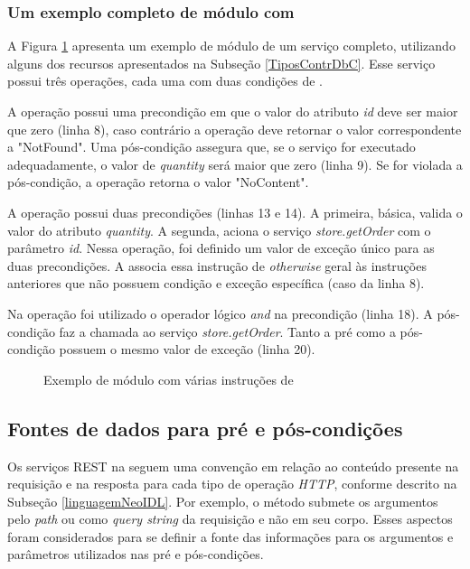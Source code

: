 \subsubsection{Um exemplo completo de módulo com \designbycontract{}}

A Figura \ref{lst:ModuloNeoVariosDbC} apresenta um exemplo de módulo \neoidl{}
de um serviço completo, utilizando alguns dos recursos apresentados na Subseção
\ref{TiposContrDbC}. Esse serviço possui três operações, cada uma com duas
condições de \designbycontract{}.

A operação  possui uma precondição em que o valor do atributo \emph{id} deve ser maior que zero (linha 8), caso contrário a operação deve retornar o valor
correspondente a "NotFound". Uma pós-condição assegura que, se o serviço for
executado adequadamente, o valor de \emph{quantity} será maior que zero (linha
9). Se for violada a pós-condição, a operação  retorna o valor
"NoContent".

A operação  possui duas precondições (linhas 13 e 14). A primeira,
básica, valida o valor do atributo \emph{quantity}. A segunda, aciona o serviço
\emph{store.getOrder} com o parâmetro \emph{id}. Nessa operação, foi
definido um valor de exceção único para as duas precondições. A \neoidl{}
associa essa instrução de \emph{otherwise} geral às instruções anteriores que
não possuem condição e exceção específica (caso da linha 8).

Na operação  foi utilizado o operador lógico \emph{and} na
precondição (linha 18). A pós-condição faz a chamada ao serviço
\emph{store.getOrder}. Tanto a pré como a pós-condição possuem o mesmo valor de
exceção (linha 20). 

\begin{figure}[htb]
\begin{scriptsize}

\end{scriptsize}
\caption{Exemplo de módulo \neoidl{} com várias instruções de \designbycontract{}}
\label{lst:ModuloNeoVariosDbC}
\end{figure} 	



\subsection{Fontes de dados para pré e pós-condições}
\label{FonteDadosDbc}

Os serviços REST na \neoidl{} seguem uma convenção em relação ao conteúdo
presente na requisição e na resposta para cada tipo de operação \emph{HTTP},
conforme descrito na Subseção \ref{linguagemNeoIDL}. Por exemplo, o método 
submete os argumentos pelo \emph{path} ou como \textit{query string} da
requisição e não em seu corpo. Esses aspectos foram considerados para se definir
a fonte das informações para os argumentos e parâmetros utilizados nas pré e
pós-condições.

